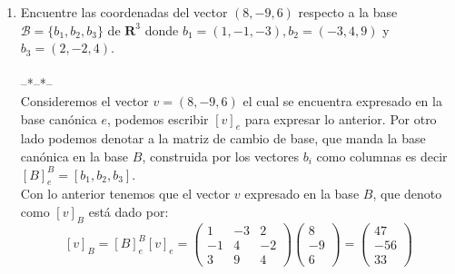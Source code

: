 \documentclass[letter]{memoir} %
\begin{document}
\begin{enumerate}
\item Encuentre las coordenadas del vector $(8,-9,6)$ respecto a la base $\mathcal{B} = \{b_1,b_2,b_3\}$ de $\mathbf{R}^3$ donde $b_1 = (1,-1,-3), b_2 = (-3,4,9)$ y $b_3 = (2,-2,4)$.\\\\
--*--*--\\
Consideremos el vector $v = (8,-9,6)$ el cual se encuentra expresado en la base canónica $e$, podemos escribir $[v]_e$ para expresar lo anterior. Por otro lado podemos denotar a la matriz de cambio de base, que manda la base canónica en la base $B$, construida por los vectores $b_i$ como columnas es decir  $[B]_e^B = [b_1,b_2,b_3]$.\\
Con lo anterior tenemos que el vector $v$ expresado en la base $B$, que denoto como $[v]_B$ está dado por:
\[
[v]_B=[B]_e^B[v]_e = \left( 
            	\begin{array}{ccc}
             	1 & -3 & 2 \\
                -1 & 4& -2 \\
                3 & 9 & 4
            	\end{array}
				\right)
                \left( 
            	\begin{array}{c}
             	8 \\
                -9 \\
                6
            	\end{array}
				\right) =                 
                \left( 
            	\begin{array}{c}
             	47\\-56\\33
            	\end{array}
                \right)
\]


\end{enumerate}
\end{document}

